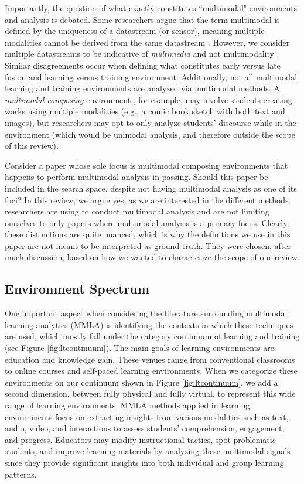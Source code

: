 \documentclass[manuscript,screen,review]{acmart}
\begin{document}
Importantly, the question of what exactly constitutes ``multimodal" environments and analysis is debated. Some researchers argue that the term multimodal is defined by the uniqueness of a datastream (or sensor), meaning multiple modalities cannot be derived from the same datastream \cite{}. However, we consider multiple datastreams to be indicative of \textit{multimedia} and not multimodality \cite{}. Similar disagreements occur when defining what constitutes early versus late fusion and learning versus training environment. Additionally, not all multimodal learning and training environments are analyzed via multimodal methods. A \textit{multimodal composing} environment \cite{}, for example, may involve students creating works using multiple modalities (e.g., a comic book sketch with both text and images), but researchers may opt to only analyze students' discourse while in the environment (which would be unimodal analysis, and therefore outside the scope of this review). 

Consider a paper whose sole focus is multimodal composing environments that happens to perform multimodal analysis in passing. Should this paper be included in the search space, despite not having multimodal analysis as one of its foci? In this review, we argue yes, as we are interested in the different methods researchers are using to conduct multimodal analysis and are not limiting ourselves to only papers where multimodal analysis is a primary focus. Clearly, these distinctions are quite nuanced, which is why the definitions we use in this paper are not meant to be interpreted as ground truth. They were chosen, after much discussion, based on how we wanted to characterize the scope of our review.


\subsection{Environment Spectrum}\label{subsec:environmentSpectrum} %


One important aspect when considering the literature surrounding multimodal learning analytics (MMLA) is identifying the contexts in which these techniques are used, which mostly fall under the category continuum of learning and training (see Figure \ref{fig:ltcontinuum}). The main goals of learning environments are education and knowledge gain. These venues range from conventional classrooms to online courses and self-paced learning environments. When we categorize these environments on our continuum shown in Figure \ref{fig:ltcontinuum}, we add a second dimension, between fully physical and fully virtual, to represent this wide range of learning environments. MMLA methods applied in learning environments focus on extracting insights from various modalities such as text, audio, video, and interactions to assess students' comprehension, engagement, and progress. Educators may modify instructional tactics, spot problematic students, and improve learning materials by analyzing these multimodal signals since they provide significant insights into both individual and group learning patterns.
\end{document}
